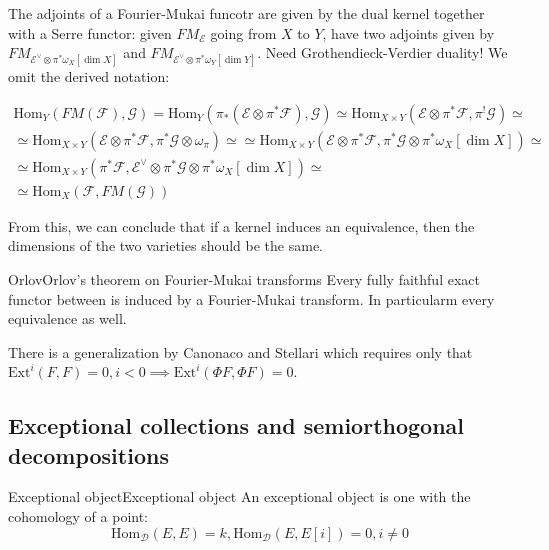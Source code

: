 The adjoints of a Fourier-Mukai funcotr are given by the dual kernel together with a Serre functor: given $FM_\mathcal{E}$ going from $X$ to $Y$, have two adjoints given by $FM_{\mathcal{E}^\lor \otimes \pi^* \omega_{X}[\dim X]}$ and $FM_{\mathcal{E}^\lor \otimes \pi^* \omega_{Y}[\dim Y]}$. Need Grothendieck-Verdier duality! We omit the derived notation:

$$\begin{gathered}
\mathrm{Hom}_{Y}(FM(\mathcal{F}), \mathcal{G})=\mathrm{Hom}_{Y} (\pi_{*} (\mathcal{E} \otimes \pi^* \mathcal{F}), \mathcal{G})\simeq \mathrm{Hom}_{X\times Y}(\mathcal{E\otimes \pi^*\mathcal{F}}, \pi^! \mathcal{G})\simeq \\ \simeq \mathrm{Hom}_{X\times Y}(\mathcal{E\otimes \pi^*\mathcal{F}}, \pi^*\mathcal{G}\otimes \omega_{\pi})\simeq \simeq \mathrm{Hom}_{X\times Y}(\mathcal{E\otimes \pi^*}\mathcal{F}, \pi^*\mathcal{G} \otimes \pi^* \omega_{X}[\dim X])\simeq \\ \simeq \mathrm{Hom}_{X\times Y}(\pi^*\mathcal{F, \mathcal{E}^\lor}\otimes \pi^*\mathcal{G} \otimes \pi^* \omega_{X}[\dim X])\simeq \\ \simeq \mathrm{Hom}_{X}(\mathcal{F}, FM(\mathcal{G}))
\end{gathered}$$

From this, we can conclude that if a kernel induces an equivalence, then the dimensions of the two varieties should be the same.

\begin{theorem}{Orlov}{Orlov's theorem on Fourier-Mukai transforms}
Every fully faithful exact functor between is induced by a Fourier-Mukai transform. In particularm every equivalence as well.
\end{theorem}
There is a generalization by Canonaco and Stellari which requires only that $\mathrm{Ext}^i(F,F)=0, i < 0 \implies \mathrm{Ext}^i(\Phi F,\Phi F)=0$. 


\subsection{Exceptional collections and semiorthogonal decompositions}

\begin{definition}{Exceptional object}{Exceptional object}
    An exceptional object is one with the cohomology of a point: $$\mathrm{Hom}_{\mathcal{D}}(E,E)=k, \mathrm{Hom}_{\mathcal{D}}(E,E[i])=0, i\neq 0$$
\end{definition}


